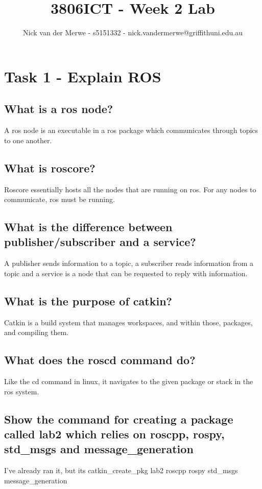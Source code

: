 \documentclass{article}
\title{3806ICT - Week 2 Lab}
\author{Nick van der Merwe - s5151332 - nick.vandermerwe@griffithuni.edu.au}
\begin{document}
\maketitle

\section{Task 1 - Explain ROS}
\subsection{What is a ros node?}

A ros node is an executable in a ros package which communicates through topics to one another.

\subsection{What is roscore?}

Roscore essentially hosts all the nodes that are running on ros. For any nodes to communicate, ros must be running. 

\subsection{What is the difference between publisher/subscriber and a service?}

A publisher sends information to a topic, a subscriber reads information from a topic and 
a service is a node that can be requested to reply with information.

\subsection{What is the purpose of catkin?}
Catkin is a build system that manages workspaces, and within those, packages, and compiling them.

\subsection{What does the roscd command do?}
Like the cd command in linux, it navigates to the given package or stack in the ros system.

\subsection{Show the command for creating a package called lab2 which relies on roscpp, rospy, std\_msgs and message\_generation}
I've already ran it, but its catkin\_create\_pkg lab2 roscpp rospy std\_msgs message\_generation
\end{document}
